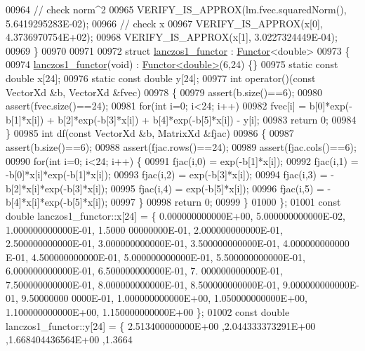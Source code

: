 \begin{DoxyCode}
00964   \textcolor{comment}{// check norm^2}
00965   VERIFY\_IS\_APPROX(lm.fvec.squaredNorm(), 5.6419295283E-02);
00966   \textcolor{comment}{// check x}
00967   VERIFY\_IS\_APPROX(x[0], 4.3736970754E+02);
00968   VERIFY\_IS\_APPROX(x[1], 3.0227324449E-04);
00969 \}
00970 
00971 
00972 \textcolor{keyword}{struct }\hyperlink{structlanczos1__functor}{lanczos1\_functor} : \hyperlink{struct_functor}{Functor}<double>
00973 \{
00974     \hyperlink{structlanczos1__functor}{lanczos1\_functor}(\textcolor{keywordtype}{void}) : \hyperlink{struct_functor}{Functor<double>}(6,24) \{\}
00975     \textcolor{keyword}{static} \textcolor{keyword}{const} \textcolor{keywordtype}{double} x[24];
00976     \textcolor{keyword}{static} \textcolor{keyword}{const} \textcolor{keywordtype}{double} y[24];
00977     \textcolor{keywordtype}{int} operator()(\textcolor{keyword}{const} VectorXd &b, VectorXd &fvec)
00978     \{
00979         assert(b.size()==6);
00980         assert(fvec.size()==24);
00981         \textcolor{keywordflow}{for}(\textcolor{keywordtype}{int} i=0; i<24; i++)
00982             fvec[i] = b[0]*exp(-b[1]*x[i]) + b[2]*exp(-b[3]*x[i]) + b[4]*exp(-b[5]*x[i])  - y[i];
00983         \textcolor{keywordflow}{return} 0;
00984     \}
00985     \textcolor{keywordtype}{int} df(\textcolor{keyword}{const} VectorXd &b, MatrixXd &fjac)
00986     \{
00987         assert(b.size()==6);
00988         assert(fjac.rows()==24);
00989         assert(fjac.cols()==6);
00990         \textcolor{keywordflow}{for}(\textcolor{keywordtype}{int} i=0; i<24; i++) \{
00991             fjac(i,0) = exp(-b[1]*x[i]);
00992             fjac(i,1) = -b[0]*x[i]*exp(-b[1]*x[i]);
00993             fjac(i,2) = exp(-b[3]*x[i]);
00994             fjac(i,3) = -b[2]*x[i]*exp(-b[3]*x[i]);
00995             fjac(i,4) = exp(-b[5]*x[i]);
00996             fjac(i,5) = -b[4]*x[i]*exp(-b[5]*x[i]);
00997         \}
00998         \textcolor{keywordflow}{return} 0;
00999     \}
01000 \};
01001 \textcolor{keyword}{const} \textcolor{keywordtype}{double} lanczos1\_functor::x[24] = \{ 0.000000000000E+00, 5.000000000000E-02, 1.000000000000E-01, 1.5000
      00000000E-01, 2.000000000000E-01, 2.500000000000E-01, 3.000000000000E-01, 3.500000000000E-01, 4.000000000000
      E-01, 4.500000000000E-01, 5.000000000000E-01, 5.500000000000E-01, 6.000000000000E-01, 6.500000000000E-01, 7.
      000000000000E-01, 7.500000000000E-01, 8.000000000000E-01, 8.500000000000E-01, 9.000000000000E-01, 9.50000000
      0000E-01, 1.000000000000E+00, 1.050000000000E+00, 1.100000000000E+00, 1.150000000000E+00 \};
01002 \textcolor{keyword}{const} \textcolor{keywordtype}{double} lanczos1\_functor::y[24] = \{ 2.513400000000E+00 ,2.044333373291E+00 ,1.668404436564E+00 ,1.3664

\end{DoxyCode}
